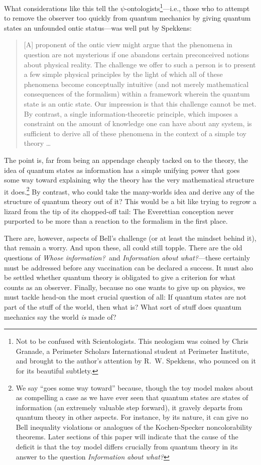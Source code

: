 What considerations like this tell the $\psi$-ontologists\footnote{Not to be confused with Scientologists.  This neologism was coined by Chris Granade, a Perimeter Scholars International student at Perimeter Institute, and brought to the author's attention by R.~W. Spekkens, who pounced on it for its beautiful subtlety.}---i.e., those who to attempt to remove the observer too quickly from quantum mechanics by giving quantum states an unfounded ontic status---was well put by Spekkens:
\begin{quote}\small
[A] proponent of the ontic view might argue that the phenomena in question are not mysterious if one abandons certain preconceived notions about physical reality.  The challenge we offer to such a person is to present a few simple physical principles by the light of which all of these phenomena become conceptually intuitive (and not merely mathematical consequences of the formalism) within a framework wherein the quantum state is an ontic state. Our impression is that this challenge cannot be met.  By contrast, a single information-theoretic principle, which imposes a constraint on the amount of knowledge one can have about any system, is sufficient to derive all of these phenomena in the context of a simple toy theory \ldots
\end{quote}
The point is, far from being an appendage cheaply tacked on to the theory, the idea of quantum states as information has a simple unifying power that goes some way toward explaining why the theory has the very mathematical structure it does.\footnote{We say ``goes some way toward'' because, though the toy model makes about as compelling a case as we have ever seen that quantum states are states of information (an extremely valuable step forward), it gravely departs from quantum theory in other aspects. For instance, by its nature, it can give no Bell inequality violations or analogues of the Kochen-Specker noncolorability theorems.  Later sections of this paper will indicate that the cause of the deficit is that the toy model differs crucially from quantum theory in its answer to the question {\it Information about what?}}  By contrast, who could take the many-worlds idea and derive any of the structure of quantum theory out of it?  This would be a bit like trying to regrow a lizard from the tip of its chopped-off tail:  The Everettian conception never purported to be more than a reaction to the formalism in the first place.

There are, however, aspects of Bell's challenge (or at least the mindset behind it), that remain a worry.  And upon these, all could still topple. There are the old questions of {\it Whose information?}\ and {\it Information about what?}---these certainly must be addressed before any vaccination can be declared a success.  It must also be settled whether quantum theory is obligated to give a criterion for what counts as an observer.  Finally, because no one wants to give up on physics, we must tackle head-on the most crucial question of all:  If quantum states are not part of the stuff of the world, then what is?  What sort of stuff does quantum mechanics say the world {\it is\/} made of?

